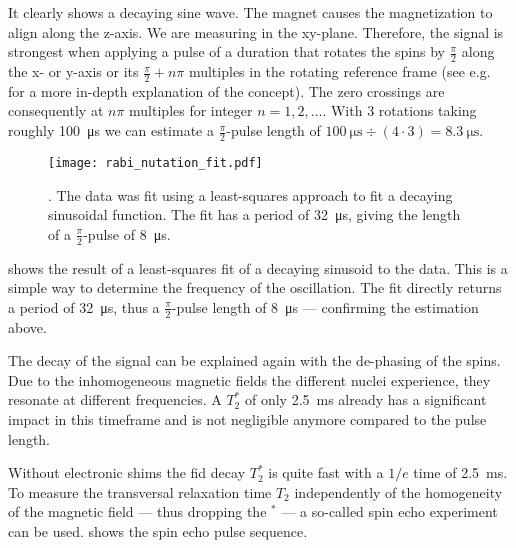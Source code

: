 It clearly shows a decaying sine wave. The magnet causes the magnetization to align along the z-axis. We are measuring in the xy-plane. Therefore, the signal is strongest when applying a pulse of a duration that rotates the spins by \(\frac{\pi}{2}\) along the x- or y-axis or its \(\frac{\pi}{2} + n\pi{}\) multiples in the rotating reference frame (see e.g.  for a more in-depth explanation of the concept). The zero crossings are consequently at \(n\pi{}\) multiples for integer \(n = 1,2,\ldots\). With 3 rotations taking roughly \qty{100}{\micro\second} we can estimate a \(\frac{\pi}{2}\)-pulse length of \(\qty{100}{\micro\second}\div (4 \cdot 3) = \qty{8.3}{\micro\second}\).

\begin{figure}[h!bt]
    \centering
    \texttt{[image: rabi\_nutation\_fit.pdf]}
    \caption{. The data was fit using a least-squares approach to fit a decaying sinusoidal function. The fit has a period of \qty{32}{\micro\second}, giving the length of a $\frac{\pi}{2}$-pulse of \qty{8}{\micro\second}.}
\end{figure}

 shows the result of a least-squares fit of a decaying sinusoid to the data. This is a simple way to determine the frequency of the oscillation. The fit directly returns a period of \qty{32}{\micro\second}, thus a \(\frac{\pi}{2}\)-pulse length of \qty{8}{\micro\second} --- confirming the estimation above.

The decay of the signal can be explained again with the de-phasing of the spins. Due to the inhomogeneous magnetic fields the different nuclei experience, they resonate at different frequencies. A \(T_2^*\) of only \qty{2.5}{\milli\second} already has a significant impact in this timeframe and is not negligible anymore compared to the pulse length.

Without electronic shims the \acrshort{fid} decay \(T_2^*\) is quite fast with a \(1/e\) time of \qty{2.5}{\milli\second}. To measure the transversal relaxation time \(T_2\) independently of the homogeneity of the magnetic field --- thus dropping the \(^*\) --- a so-called spin echo experiment can be used.  shows the spin echo pulse sequence.


